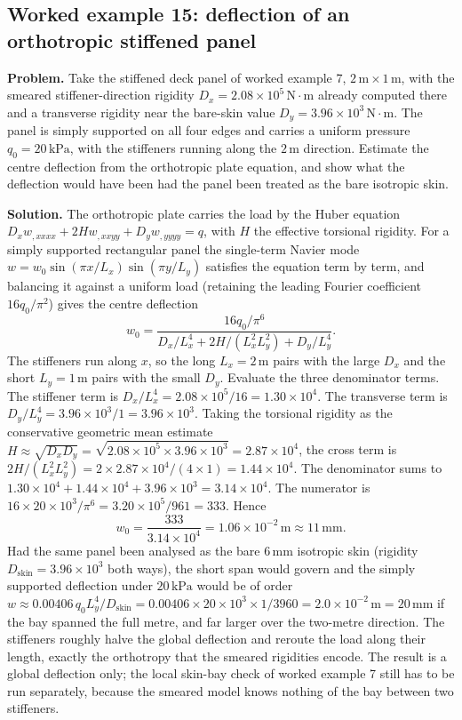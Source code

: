 \subsection*{Worked example 15: deflection of an orthotropic stiffened panel}

\textbf{Problem.} Take the stiffened deck panel of worked example 7,
$2\,\si{\meter}\times 1\,\si{\meter}$, with the smeared stiffener-direction
rigidity $D_x = 2.08\times 10^5\,\text{N}\cdot\text{m}$ already computed
there and a transverse rigidity near the bare-skin value $D_y = 3.96\times
10^3\,\text{N}\cdot\text{m}$. The panel is simply supported on all four
edges and carries a uniform pressure $q_0 = 20\,\text{kPa}$, with the
stiffeners running along the $2\,\si{\meter}$ direction. Estimate the
centre deflection from the orthotropic plate equation, and show what the
deflection would have been had the panel been treated as the bare
isotropic skin.

\textbf{Solution.} The orthotropic plate carries the load by the Huber
equation $D_x w_{,xxxx} + 2H w_{,xxyy} + D_y w_{,yyyy} = q$, with $H$ the
effective torsional rigidity. For a simply supported rectangular panel the
single-term Navier mode $w = w_0 \sin(\pi x/L_x)\sin(\pi y/L_y)$ satisfies
the equation term by term, and balancing it against a uniform load
(retaining the leading Fourier coefficient $16 q_0/\pi^2$) gives the centre
deflection
\[
w_0 = \frac{16 q_0/\pi^6}
{D_x/L_x^4 + 2H/(L_x^2 L_y^2) + D_y/L_y^4}.
\]
The stiffeners run along $x$, so the long $L_x = 2\,\si{\meter}$ pairs with
the large $D_x$ and the short $L_y = 1\,\si{\meter}$ pairs with the small
$D_y$. Evaluate the three denominator terms. The stiffener term is
$D_x/L_x^4 = 2.08\times 10^5/16 = 1.30\times 10^4$. The transverse term is
$D_y/L_y^4 = 3.96\times 10^3/1 = 3.96\times 10^3$. Taking the torsional
rigidity as the conservative geometric mean estimate $H \approx \sqrt{D_x
D_y} = \sqrt{2.08\times 10^5\times 3.96\times 10^3} = 2.87\times 10^4$, the
cross term is $2H/(L_x^2 L_y^2) = 2\times 2.87\times 10^4/(4\times 1) =
1.44\times 10^4$. The denominator sums to $1.30\times 10^4 + 1.44\times
10^4 + 3.96\times 10^3 = 3.14\times 10^4$. The numerator is $16\times 20
\times 10^3/\pi^6 = 3.20\times 10^5/961 = 333$. Hence
\[
w_0 = \frac{333}{3.14\times 10^4} = 1.06\times 10^{-2}\,\text{m}
\approx 11\,\si{\milli\meter}.
\]
Had the same panel been analysed as the bare $6\,\si{\milli\meter}$
isotropic skin (rigidity $D_{\text{skin}} = 3.96\times 10^3$ both ways),
the short span would govern and the simply supported deflection under
$20\,\text{kPa}$ would be of order $w \approx 0.00406\,q_0 L_y^4/D_{\text{
skin}} = 0.00406\times 20\times 10^3\times 1/3960 = 2.0\times 10^{-2}\,
\text{m} = 20\,\si{\milli\meter}$ if the bay spanned the full metre, and far
larger over the two-metre direction. The stiffeners roughly halve the
global deflection and reroute the load along their length, exactly the
orthotropy that the smeared rigidities encode. The result is a global
deflection only; the local skin-bay check of worked example 7 still has to
be run separately, because the smeared model knows nothing of the bay
between two stiffeners.

